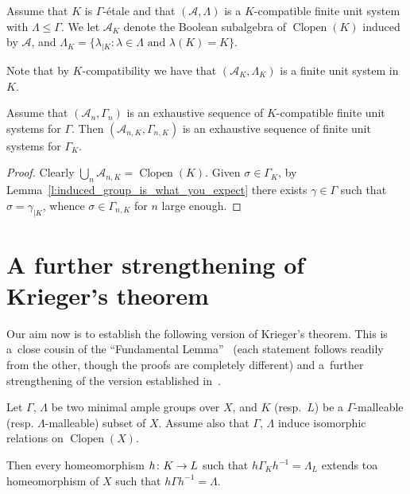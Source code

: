 \documentclass[AHL,Unicode]{cedram}
\DeclareMathOperator{\Clopen}{Clopen}
\newcommand{\mcA}{\mathcal{A}}
\renewcommand*{\to}{\mathchoice{\longrightarrow}{\rightarrow}{\rightarrow}{\rightarrow}}
\begin{document}
\begin{defi}
Assume that $K$ is $\Gamma$-étale and that $(\mcA,\Lambda)$ is a $K$-compatible finite unit system with $\Lambda \le \Gamma$. We let $\mcA_K$ denote the Boolean subalgebra of $\Clopen(K)$ induced by $\mcA$, and $\Lambda_K=\{\lambda_{|K} : \lambda\in \Lambda \text{ and } \lambda(K)=K\}$.

Note that by $K$-compatibility we have that $(\mcA_K,\Lambda_K)$ is a finite unit system in $K$.
\end{defi}

\begin{lemm}
Assume that $(\mcA_n,\Gamma_n)$ is an exhaustive sequence of $K$-compatible finite unit systems for $\Gamma$. Then $(\mcA_{n,K},\Gamma_{n,K})$ is an exhaustive sequence of finite unit systems for $\Gamma_K$.
\end{lemm}

\begin{proof}
Clearly $\bigcup_n \mcA_{n,K}=\Clopen(K)$. Given $\sigma \in \Gamma_K$, by Lemma~\ref{l:induced_group_is_what_you_expect} there exists $\gamma \in \Gamma$ such that $\sigma=\gamma_{|K}$, whence $\sigma \in \Gamma_{n,K}$ for $n$ large enough.
\end{proof}

\section{A further strengthening of Krieger's theorem}\label{s:Krieger}

Our aim now is to establish the following version of Krieger's theorem. This is a~close cousin of the ``Fundamental Lemma''~\cite[Lemma~4.15]{Giordano2004} (each statement follows readily from the other, though the proofs are completely different) and a~further strengthening of the version established in~\cite[Theorem~3.11]{Melleray2023}.

\begin{theo}\label{t:ultimate_Krieger}
Let $\Gamma$, $\Lambda$ be two minimal ample groups over $X$, and $K$ (resp.~$L$) be a $\Gamma$-malleable (resp. $\Lambda$-malleable) subset of $X$. Assume also that $\Gamma$, $\Lambda$ induce isomorphic relations on $\Clopen(X)$.

Then every homeomorphism $h \colon K \to L$ such that $h\Gamma_K h^{-1} = \Lambda_L$ extends to\linebreak a homeomorphism of $X$ such that $h \Gamma h^{-1}= \Lambda$.
\end{theo}
\end{document}
